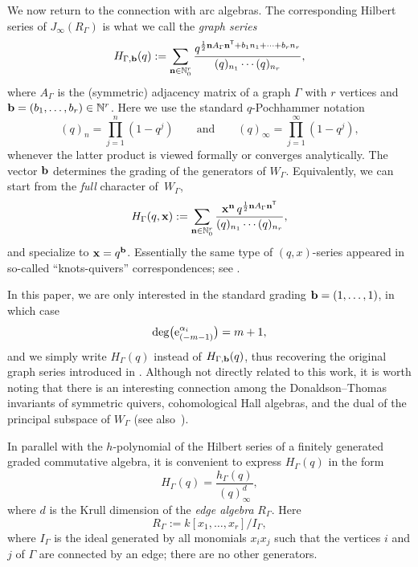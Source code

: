 \documentclass[pdftex]{sigma}
\numberwithin{equation}{section}
\theoremstyle{definition}
\begin{document}
We now return to the connection with arc algebras.
The corresponding Hilbert series of $J_\infty(R_\Gamma)$ is what we call the {\em graph series}
\begin{equation*}%
H_{\Gamma,{\bf b}}(q):=\sum_{{\bf n} \in\mathbb{N}_0^r}
\frac{q^{\frac12 {\bf n}A_\Gamma{\bf n}^{\mathsf{T}}+b_1n_1+\cdots+b_rn_r}}
{(q)_{n_1}\cdots(q)_{n_r}},
\end{equation*}
where $A_\Gamma$ is the (symmetric) adjacency matrix of a graph $\Gamma$ with $r$ vertices and ${\bf b}=(b_1,\dots,b_r)\in\mathbb{N}^r$.
Here we use the standard $q$-Pochhammer notation
\[
(q)_n=\prod_{j=1}^n(1-q^j) \qquad \text{and} \qquad (q)_\infty=\prod_{j=1}^\infty(1-q^j),
\]
 whenever the latter product is viewed formally or converges analytically.
The vector ${\bf b}$ determines the grading of the generators of $W_\Gamma$. Equivalently, we can start from the {\em full} character of~$W_\Gamma$,
\begin{equation*}%
H_{\Gamma}(q,{\bf x}):=
\sum_{{\bf n}\in\mathbb{N}_0^r}
\frac{{\bf x}^{\bf n}\,
q^{\frac12{\bf n}A_\Gamma{\bf n}^{\mathsf{T}}}}
{(q)_{n_1}\cdots(q)_{n_r}},
\end{equation*}
and specialize to ${\bf x}=q^{\bf b}$. Essentially the same type of $(q,x)$-series appeared in so-called ``knots-quivers'' correspondences; see \cite{Ekholm,Quivers}.

In this paper, we are only interested in the standard grading ${\bf b}=(1,\dots,1)$, in which case
\[
\deg \bigl({\rm e}^{\alpha_i}_{(-m-1)}\bigr)=m+1,
\]
and we simply write $H_\Gamma(q)$ instead of $H_{\Gamma,{\bf b}}(q)$, thus recovering the original graph series introduced in \cite{BJM,JM1,JM2}. Although not directly related to this work, it is worth noting that there is an interesting connection among the Donaldson--Thomas invariants of symmetric quivers, cohomological Hall algebras, and the dual of the principal subspace of $W_{\Gamma}$ \cite{DFR,DM} (see also~\cite{Efimov}).

In parallel with the $h$-polynomial of the Hilbert series of a finitely generated graded commutative algebra, it is convenient to
express $H_{\Gamma}(q)$ in the form
\[
H_{\Gamma}(q)=\frac{h_\Gamma(q)}{(q)_\infty^d},
\]
where $d$ is the Krull dimension of the {\em edge algebra} $R_\Gamma$. Here \begin{equation} \label{gamma}
R_\Gamma:=k[x_1,\dots,x_r]/I_\Gamma,
\end{equation}
 where $I_\Gamma$ is the ideal generated by all monomials $x_i x_j$ such that the vertices $i$ and $j$ of $\Gamma$ are connected by an edge; there are no other generators.
\end{document}
